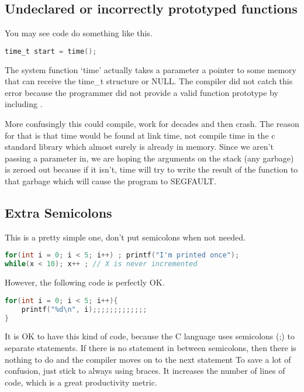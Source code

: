\subsection{Undeclared or incorrectly prototyped functions}

You may see code do something like this.

\begin{lstlisting}[language=C]
time_t start = time();
\end{lstlisting}

The system function `time' actually takes a parameter a pointer to some memory that can receive the time\_t structure or NULL.
The compiler did not catch this error because the programmer did not provide a valid function prototype by including .

More confusingly this could compile, work for decades and then crash. The reason for that is that time would be found at link time, not compile time in the c standard library which almost surely is already in memory.
Since we aren't passing a parameter in, we are hoping the arguments on the stack (any garbage) is zeroed out because if it isn't, time will try to write the result of the function to that garbage which will cause the program to SEGFAULT.

\subsection{Extra Semicolons}

This is a pretty simple one, don't put semicolons when not needed.

\begin{lstlisting}[language=C]
for(int i = 0; i < 5; i++) ; printf("I'm printed once");
while(x < 10); x++ ; // X is never incremented
\end{lstlisting}

However, the following code is perfectly OK.

\begin{lstlisting}[language=C]
for(int i = 0; i < 5; i++){
    printf("%d\n", i);;;;;;;;;;;;;
}
\end{lstlisting}

It is OK to have this kind of code, because the C language uses
semicolons (;) to separate statements. If there is no statement in
between semicolons, then there is nothing to do and the compiler moves on to the next statement
To save a lot of confusion, just stick to always using braces.
It increases the number of lines of code, which is a great productivity metric.

